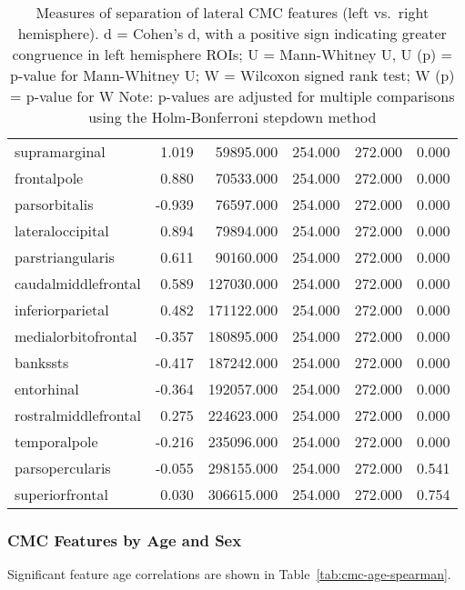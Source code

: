 \documentclass{article}
\begin{document}
\begin{table}
\begin{tabular}{lrrrrr}
	supramarginal            &  1.019 &  59895.000  & 254.000 & 272.000 & 0.000 \\
	frontalpole              &  0.880 &  70533.000  & 254.000 & 272.000 & 0.000 \\
	parsorbitalis            & -0.939 &  76597.000  & 254.000 & 272.000 & 0.000 \\
	lateraloccipital         &  0.894 &  79894.000  & 254.000 & 272.000 & 0.000 \\
	parstriangularis         &  0.611 &  90160.000  & 254.000 & 272.000 & 0.000 \\
	caudalmiddlefrontal      &  0.589 &  127030.000 & 254.000 & 272.000 & 0.000 \\
	inferiorparietal         &  0.482 &  171122.000 & 254.000 & 272.000 & 0.000 \\
	medialorbitofrontal      & -0.357 &  180895.000 & 254.000 & 272.000 & 0.000 \\
	bankssts                 & -0.417 &  187242.000 & 254.000 & 272.000 & 0.000 \\
	entorhinal               & -0.364 &  192057.000 & 254.000 & 272.000 & 0.000 \\
	rostralmiddlefrontal     &  0.275 &  224623.000 & 254.000 & 272.000 & 0.000 \\
	temporalpole             & -0.216 &  235096.000 & 254.000 & 272.000 & 0.000 \\
	parsopercularis          & -0.055 &  298155.000 & 254.000 & 272.000 & 0.541 \\
	superiorfrontal          &  0.030 &  306615.000 & 254.000 & 272.000 & 0.754 \\
	\bottomrule
\end{tabular}
\footnotesize
\caption{Measures of separation of lateral CMC features (left vs.\ right
hemisphere). d = Cohen's d, with a positive sign indicating greater congruence in left hemisphere ROIs;
U = Mann-Whitney U, U (p) = p-value for Mann-Whitney U;
W = Wilcoxon signed rank test; W (p) = p-value for W
Note: p-values are adjusted for multiple comparisons using the Holm-Bonferroni stepdown method
}
\normalsize
\label{tab:lateral-cmc}
\end{table}


\subsubsection{CMC Features by Age and Sex}

Significant feature age correlations are shown in Table~\ref{tab:cmc-age-spearman}.
\end{document}
